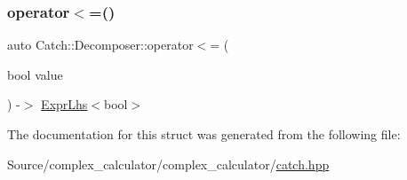 \mbox{\label{struct_catch_1_1_decomposer_aac129b94903ae1339d5709049d83613b}} 
\subsubsection{\texorpdfstring{operator$<$=()}{operator<=()}\hspace{0.1cm}{\footnotesize\ttfamily [2/2]}}
{\footnotesize\ttfamily auto Catch\+::\+Decomposer\+::operator$<$= (\begin{DoxyParamCaption}\item[{bool}]{value }\end{DoxyParamCaption}) -\/$>$ \mbox{\hyperlink{class_catch_1_1_expr_lhs}{Expr\+Lhs}}$<$bool$>$ \hspace{0.3cm}{\ttfamily [inline]}}



The documentation for this struct was generated from the following file\+:\begin{DoxyCompactItemize}
\item 
Source/complex\+\_\+calculator/complex\+\_\+calculator/\mbox{\hyperlink{catch_8hpp}{catch.\+hpp}}\end{DoxyCompactItemize}
